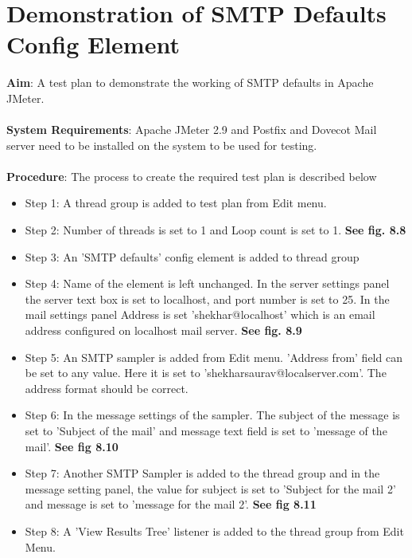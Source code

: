 \documentclass[12pt]{book}
\begin{document}
  \section{Demonstration of SMTP Defaults Config Element}
  
  \textbf{Aim}: A test plan to demonstrate the working of SMTP defaults in Apache JMeter.\\
  \\
  \textbf{System Requirements}: Apache JMeter 2.9 and Postfix and Dovecot Mail server need to be installed
      on the system to be used for testing.\\
  \\
  \textbf{Procedure}: The process to create the required test plan is described below\\
  \begin{itemize}
    \item Step 1: A thread group is added to test plan from Edit menu.\\
    \item Step 2: Number of threads is set to 1 and Loop count is set to 1. \textbf{See fig. 8.8}\\ 
    \item Step 3: An 'SMTP defaults' config element is added to thread group\\
    \item Step 4: Name of the element is left unchanged. In the server settings panel the server text box is
	    set to localhost, and port number is set to 25. In the mail settings panel Address is set
	    'shekhar@localhost' which is an email address configured on localhost mail server.
	    \textbf{See fig. 8.9}\\
    \item Step 5: An SMTP sampler is added from Edit menu. 'Address
	    from' field can be set to any value. Here it is set to 'shekharsaurav@localserver.com'.
	    The address format should be correct.\\
    \item Step 6: In the message settings of the sampler. The subject of the message is set to 'Subject of the
	    mail' and message text field is set to 'message of the mail'.
	    \textbf{See fig 8.10}\\
    \item Step 7: Another SMTP Sampler is added to the thread group and in the message setting panel, the
	    value for subject is set to 'Subject for the mail 2' and message is set to 'message for the
	    mail 2'. \textbf{See fig 8.11}\\
    \item Step 8: A 'View Results Tree' listener is added to the thread group from Edit Menu.\\
  \end{itemize}
  
\end{document}
